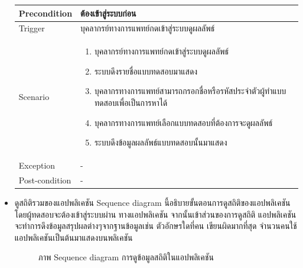 \documentclass[12pt,oneside,openright,a4paper]{cpe-thai-project}
\begin{document}
\begin{itemize}
\begin{table}[!h]
\begin{tabular}{|p{3cm}|p{12cm}|}
      Precondition & ต้องเข้าสู่ระบบก่อน \\ \hline
      Trigger & บุคลากรย์ทางการแพทย์กดเข้าสู่ระบบดูผลลัพธ์ \\ \hline
      Scenario & \begin{enumerate}
        \item บุคลากรย์ทางการแพทย์กดเข้าสู่ระบบดูผลลัพธ์
        \item ระบบดึงรายชื่อแบบทดสอบมาแสดง
        \item บุคลากรทางการแพทย์สามารถกรอกชื่อหรือรหัสประจำตัวผู้ทำแบบทดสอบเพื่อเป็นการหาได้ 
        \item บุคลากรทางการแพทย์เลือกแบบทดสอบที่ต้องการจะดูผลลัพธ์
        \item ระบบดึงข้อมูลผลลัพธ์แบบทดสอบนั้นมาแสดง 
      \end{enumerate} \\ \hline
      Exception & - \\ \hline
      Post-condition & - \\ \hline
      \end{tabular}
      \end{table}
     \newpage
    \item ดูสถิติรวมของแอปพลิเคชัน
    Sequence diagram นี้อธิบายขั้นตอนการดูสถิติของแอปพลิเคชันโดยผู้ทดสอบจะต้องเข้าสู่ระบบผ่าน ทางแอปพลิเคชัน จากนั้นเข้าส่วนของการดูสถิติ
     แอปพลิเคชันจะทำการดึงข้อมูลสรุปผลต่างๆจากฐานข้อมูลเช่น ตัวอักษรใดที่คน เขียนผิดมากที่สุด จำนวนคนใช้แอปพลิเคชันเป็นต้นมาแสดงบนพลิเคชัน
    \begin{figure}[!ht]\centering
      \setlength{\fboxrule}{0.2mm} %
      \setlength{\fboxsep}{1cm}
      \caption{ภาพ Sequence diagram การดูข้อมูลสถิติในแอปพลิเคชัน}\label{fig:activity3}

\end{figure}
\end{itemize}
\end{document}
